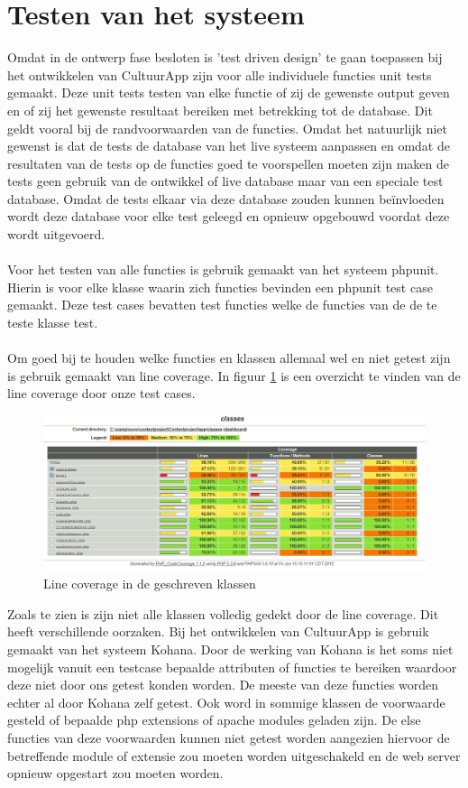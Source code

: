\documentclass[a4paper,10pt]{article}
\begin{document}
\section{Testen van het systeem}
Omdat in de ontwerp fase besloten is 'test driven design' te gaan toepassen bij het ont\-wikkelen van CultuurApp zijn voor alle individuele functies unit tests gemaakt. Deze unit tests testen van elke functie of zij de gewenste output geven en of zij het gewenste resultaat bereiken met betrekking tot de database. Dit geldt vooral bij de randvoorwaarden van de functies. Omdat het natuurlijk niet gewenst is dat de tests de database van het live systeem aanpassen en omdat de resultaten van de tests op de functies goed te voorspellen moeten zijn maken de tests geen gebruik van de ontwikkel of live database maar van een speciale test database. Omdat de tests elkaar via deze database zouden kunnen be\"invloeden wordt deze database voor elke test geleegd en opnieuw opgebouwd voordat deze wordt uitgevoerd. \\
\\
Voor het testen van alle functies is gebruik gemaakt van het systeem phpunit. Hierin is voor elke klasse waarin zich functies bevinden een phpunit test case gemaakt. Deze test cases bevatten test functies welke de functies van de de te teste klasse test.\\
\\
Om goed bij te houden welke functies en klassen allemaal wel en niet getest zijn is gebruik gemaakt van line coverage. In figuur \ref{classes} is een overzicht te vinden van de line coverage door onze test cases.\\
\begin{figure}[ht!]
	\centering
	\includegraphics[width=\textwidth]{classes.png}
	\caption{Line coverage in de geschreven klassen \label{classes}}
\end{figure}
Zoals te zien is zijn niet alle klassen volledig gedekt door de line coverage. Dit heeft verschillende oorzaken. Bij het ontwikkelen van CultuurApp is gebruik gemaakt van het systeem Kohana. Door de werking van Kohana is het soms niet mogelijk vanuit een testcase bepaalde attributen of functies te bereiken waardoor deze niet door ons getest konden worden. De meeste van deze functies worden echter al door Kohana zelf getest. Ook word in sommige klassen de voorwaarde gesteld of bepaalde php extensions of apache modules geladen zijn. De else functies van deze voorwaarden kunnen niet getest worden aangezien hiervoor de betreffende module of extensie zou moeten worden uitgeschakeld en de web server opnieuw opgestart zou moeten worden.
		
\end{document}
